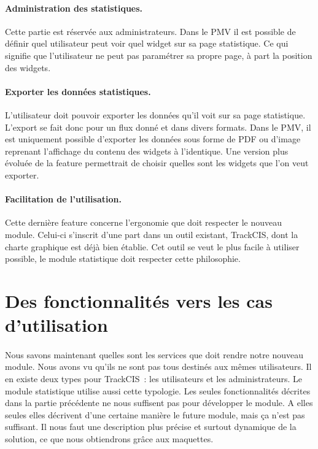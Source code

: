 			\paragraph{Administration des statistiques.}
			Cette partie est réservée aux administrateurs. Dans le
			PMV il est possible de définir quel utilisateur peut voir quel widget sur sa
			page statistique. Ce qui signifie que l'utilisateur ne peut pas paramétrer
			sa propre page, à part la position des widgets.
			
			\paragraph{Exporter les données statistiques.}
			L'utilisateur doit pouvoir exporter les données qu'il voit sur sa page
			statistique. L'export se fait donc pour un flux donné et dans divers formats.
			Dans le PMV, il est uniquement possible d'exporter les données sous forme de
			PDF ou d'image reprenant l'affichage du contenu des widgets à l'identique.
			Une version plus évoluée de la feature permettrait de choisir quelles sont
			les widgets que l'on veut exporter.
			
			\paragraph{Facilitation de l’utilisation.}
			Cette dernière feature concerne l'ergonomie que doit respecter le nouveau
			module. Celui-ci s'inscrit d'une part dans un outil existant, TrackCIS, dont
			la charte graphique est déjà bien établie. Cet outil se veut le plus facile à
			utiliser possible, le module statistique doit respecter cette philosophie.
	
	\section{Des fonctionnalités vers les cas d'utilisation}
		\paragraph{}
		Nous savons maintenant quelles sont les services que doit rendre notre nouveau
		module. Nous avons vu qu'ils ne sont pas tous destinés aux mêmes utilisateurs.
		Il en existe deux types pour TrackCIS~: les utilisateurs et les
		administrateurs. Le module statistique utilise aussi cette typologie. Les
		seules fonctionnalités décrites dans la partie précédente ne nous suffisent
		pas pour développer le module. A elles seules elles décrivent d'une certaine
		manière le future module, mais ça n'est pas suffisant. Il nous faut une
		description plus précise et surtout dynamique de la solution, ce que nous
		obtiendrons grâce aux maquettes.
		
